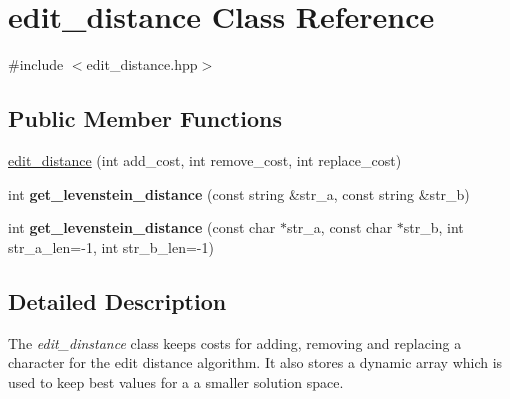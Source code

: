\hypertarget{classedit__distance}{\section{edit\+\_\+distance Class Reference}
\label{classedit__distance}
}


{\ttfamily \#include $<$edit\+\_\+distance.\+hpp$>$}

\subsection*{Public Member Functions}
\begin{DoxyCompactItemize}
\item 
\hyperlink{classedit__distance_a6aacfb46e57db524db243234ed349bff}{edit\+\_\+distance} (int add\+\_\+cost, int remove\+\_\+cost, int replace\+\_\+cost)
\item 
\hypertarget{classedit__distance_afee05eeeefaa9d657d247f05530b51c4}{int {\bfseries get\+\_\+levenstein\+\_\+distance} (const string \&str\+\_\+a, const string \&str\+\_\+b)}\label{classedit__distance_afee05eeeefaa9d657d247f05530b51c4}

\item 
\hypertarget{classedit__distance_a2f059d1dfb3d76e8938376ba907c952c}{int {\bfseries get\+\_\+levenstein\+\_\+distance} (const char $\ast$str\+\_\+a, const char $\ast$str\+\_\+b, int str\+\_\+a\+\_\+len=-\/1, int str\+\_\+b\+\_\+len=-\/1)}\label{classedit__distance_a2f059d1dfb3d76e8938376ba907c952c}

\end{DoxyCompactItemize}


\subsection{Detailed Description}
The {\itshape edit\+\_\+dinstance} class keeps costs for adding, removing and replacing a character for the edit distance algorithm. It also stores a dynamic array which is used to keep best values for a a smaller solution space. 

